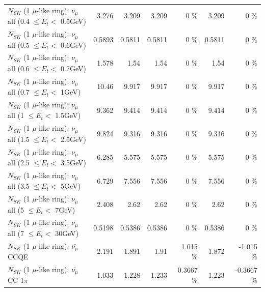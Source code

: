 \begin{table}
\begin{tabular}{| l | r | r | r  r | r  r |}
       $N_{SK}$ (1 $\mu$-like ring): $\nu_{\mu}$ all (0.4 $\leq E_{t} <$ 0.5GeV) &           3.276 &           3.209 &           3.209 &        0 \%  &           3.209 &        0 \%  \\ 
       $N_{SK}$ (1 $\mu$-like ring): $\nu_{\mu}$ all (0.5 $\leq E_{t} <$ 0.6GeV) &          0.5893 &          0.5811 &          0.5811 &        0 \%  &          0.5811 &        0 \%  \\ 
       $N_{SK}$ (1 $\mu$-like ring): $\nu_{\mu}$ all (0.6 $\leq E_{t} <$ 0.7GeV) &           1.578 &            1.54 &            1.54 &        0 \%  &            1.54 &        0 \%  \\ 
         $N_{SK}$ (1 $\mu$-like ring): $\nu_{\mu}$ all (0.7 $\leq E_{t} <$ 1GeV) &           10.46 &           9.917 &           9.917 &        0 \%  &           9.917 &        0 \%  \\ 
         $N_{SK}$ (1 $\mu$-like ring): $\nu_{\mu}$ all (1 $\leq E_{t} <$ 1.5GeV) &           9.362 &           9.414 &           9.414 &        0 \%  &           9.414 &        0 \%  \\ 
       $N_{SK}$ (1 $\mu$-like ring): $\nu_{\mu}$ all (1.5 $\leq E_{t} <$ 2.5GeV) &           9.824 &           9.316 &           9.316 &        0 \%  &           9.316 &        0 \%  \\ 
       $N_{SK}$ (1 $\mu$-like ring): $\nu_{\mu}$ all (2.5 $\leq E_{t} <$ 3.5GeV) &           6.285 &           5.575 &           5.575 &        0 \%  &           5.575 &        0 \%  \\ 
         $N_{SK}$ (1 $\mu$-like ring): $\nu_{\mu}$ all (3.5 $\leq E_{t} <$ 5GeV) &           6.729 &           7.556 &           7.556 &        0 \%  &           7.556 &        0 \%  \\ 
           $N_{SK}$ (1 $\mu$-like ring): $\nu_{\mu}$ all (5 $\leq E_{t} <$ 7GeV) &           2.408 &            2.62 &            2.62 &        0 \%  &            2.62 &        0 \%  \\ 
          $N_{SK}$ (1 $\mu$-like ring): $\nu_{\mu}$ all (7 $\leq E_{t} <$ 30GeV) &          0.5198 &          0.5386 &          0.5386 &        0 \%  &          0.5386 &        0 \%  \\ 
\hline
\hline
\hline
                              $N_{SK}$ (1 $\mu$-like ring): $\bar{\nu_\mu}$ CCQE &           2.191 &           1.891 &            1.91 &    1.015 \%  &           1.872 &   -1.015 \%  \\ 
                         $N_{SK}$ (1 $\mu$-like ring): $\bar{\nu_\mu}$ CC 1$\pi$ &           1.033 &           1.228 &           1.233 &   0.3667 \%  &           1.223 &  -0.3667 \%  \\ 

\end{tabular}
\end{table}
